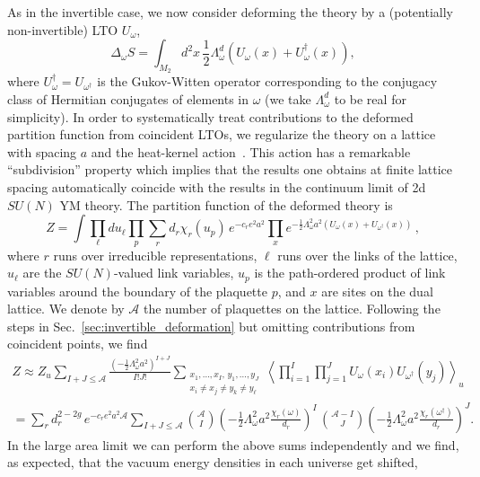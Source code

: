 \documentclass[11pt]{article}
\def\tfrac#1#2{{\textstyle{\frac{#1}{#2}}}}
\begin{document}
As in the invertible case, we now consider deforming the theory by a (potentially non-invertible) LTO $U_\omega$, 
\begin{equation}
    \Delta_\omega S = \int_{M_2}d^2x\, \tfrac{1}{2}\Lambda_\omega^d\left( U_\omega(x) + U_\omega^\dagger(x)\right),
\end{equation}
where $U_\omega^\dagger = U_{\omega^\dagger}$ is the Gukov-Witten operator corresponding to the conjugacy class of Hermitian conjugates of elements in $\omega$ (we take $\Lambda_{\omega}^d$ to be real for simplicity). In order to systematically treat contributions to the deformed partition function from coincident LTOs, we regularize the theory on a lattice with spacing $a$ and the heat-kernel action~\cite{Migdal:1975zg,Witten:1991we,Nguyen:2021naa}. This action has a remarkable ``subdivision'' property which implies that the results one obtains at finite lattice spacing automatically coincide with the results in the continuum limit of 2d $SU(N)$ YM theory.  The partition function of the deformed theory is
\begin{equation}
Z = \int\prod_\ell du_\ell \prod_p \sum_r d_{r}\chi_{r}(u_p)\, e^{-c_{r} e^2a^2}\prod_{x}e^{-\tfrac{1}{2}\Lambda_\omega^2a^2\left(U_\omega(x) + U_{\omega^\dagger}(x)\right)}\,,
\end{equation}
where $r$ runs over irreducible representations, $\ell$ runs over the links of the lattice, $u_\ell$ are the $SU(N)$-valued link variables, $u_p$ is the path-ordered product of link variables around the boundary of the plaquette $p$, and ${x}$ are sites on the dual lattice. We denote by $\mathcal A$ the number of plaquettes on the lattice. Following the steps in Sec.~\ref{sec:invertible_deformation} but omitting contributions from coincident points, we find 
\begin{align}
Z \approx Z_u \sum_{I+J \le \mathcal{A}} \frac{(-\tfrac{1}{2}\Lambda_\omega^2 a^2)^{I+J}}{I!J!}\sum_{\substack{x_1,\ldots, x_I, \,  y_1,\ldots,  y_J \\  x_i \not=  x_j \not=  y_k \not= y_\ell}} \left\langle \prod_{i=1}^I\prod_{j=1}^J U_\omega( x_i)U_{\omega^\dagger}( y_j)\right\rangle_u \\
=\sum_{r}d_{r}^{2-2g}\, e^{-c_{r} e^2a^2\mathcal A}\sum_{I+J \le \mathcal{A}} \binom{\mathcal A}{I}\left(-\tfrac{1}{2}\Lambda_\omega^2a^2\frac{\chi_r(\omega)}{d_{r}}\right)^I \,  \binom{\mathcal{A}-I}{J} \left(-\tfrac{1}{2}\Lambda_\omega^2a^2\frac{\chi_r(\omega^\dagger)}{d_{r}}\right)^J. 
\end{align}
In the large area limit we can perform the above sums independently and we find, as expected, that the vacuum energy densities in each universe get shifted,
\end{document}
